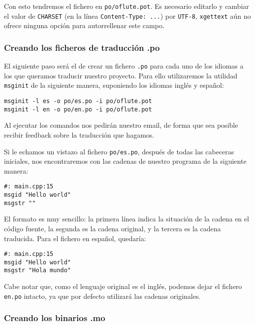 Con esto tendremos el fichero en \texttt{po/oflute.pot}. Es necesario editarlo y
cambiar el valor de \texttt{CHARSET} (en la línea \texttt{Content-Type: ...})
por \texttt{UTF-8}, \texttt{xgettext} aún no ofrece ninguna opción para
autorrellenar este campo.

\subsubsection{Creando los ficheros de traducción .po}

El siguiente paso será el de crear un fichero \texttt{.po} para cada uno de los
idiomas a los que queramos traducir nuestro proyecto. Para ello utilizaremos la
utilidad \texttt{msginit} de la siguiente manera, suponiendo los idiomas inglés
y español:

\begin{verbatim}
msginit -l es -o po/es.po -i po/oflute.pot
msginit -l en -o po/en.po -i po/oflute.pot
\end{verbatim}

Al ejecutar los comandos nos pedirán nuestro email, de forma que sea posible
recibir feedback sobre la traducción que hagamos.

\medskip

Si le echamos un vistazo al fichero \texttt{po/es.po}, después de todas las
cabeceras iniciales, nos encontraremos con las cadenas de nuestro programa de la
siguiente manera:

\begin{verbatim}
#: main.cpp:15
msgid "Hello world"
msgstr ""
\end{verbatim}

El formato es muy sencillo: la primera línea indica la situación de la
cadena en el código fuente, la segunda es la cadena original, y la
tercera es la cadena traducida. Para el fichero en español, quedaría:

\begin{verbatim}
#: main.cpp:15
msgid "Hello world"
msgstr "Hola mundo"
\end{verbatim}

Cabe notar que, como el lenguaje original es el inglés, podemos dejar el fichero
\texttt{en.po} intacto, ya que por defecto utilizará las cadenas originales.

\subsubsection{Creando los binarios .mo}

